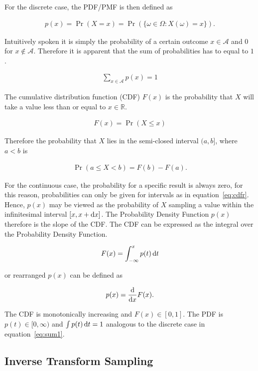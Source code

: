 For the discrete case, the PDF/PMF is then defined as

\begin{align}
p(x) = \Pr(X = x) = \Pr( \{\omega \in \Omega : X(\omega) = x \} ).
\end{align}

Intuitively spoken it is simply the probability of a certain outcome $x \in \mathcal{A}$ and $0$ for $x \notin \mathcal{A}$. Therefore it is apparent that the sum of probabilities has to equal to $1$.

\begin{align}
\label{eq:sum1}
\sum_{x\in\mathcal{A}}p(x) = 1
\end{align}

The cumulative distribution function (CDF) $F(x)$ is the probability that $X$ will take a value less than or equal to $x \in \mathbb{R}$.

\begin{align}
 F(x) = \Pr(X \leq x)
\end{align}

Therefore the probability that $X$ lies in the semi-closed interval $(a, b]$, where $a < b$ is  

\begin{align}
\label{eq:cdfr}
 \Pr(a \leq X < b) = F(b) - F(a).
\end{align}

For the continuous case, the probability for a specific result is always zero, for this reason, probabilities can only be given for intervals as in equation~\ref{eq:cdfr}. Hence, $p(x)$ may be viewed as the probability of $X$ sampling a value within the infinitesimal interval $[x, x + \mathop{}\!\mathrm{d} x]$. The Probability Density Function $p(x)$ therefore is the slope of the CDF. The CDF can be expressed as the integral over the Probability Density Function.

\begin{align}
\label{eq:cdfc}
 F(x) = \int_{-\infty}^{x}p(t)\mathop{}\!\mathrm{d} t
\end{align}

or rearranged $p(x)$ can be defined as

\begin{align}
 p(x) = \frac{\mathop{}\!\mathrm{d}}{\mathop{}\!\mathrm{d} x} F(x).
\end{align}

The CDF is monotonically increasing and $F(x) \in [0,1]$. The PDF is $p(t) \in [0, \infty)$ and $\int p(t)\mathop{}\!\mathrm{d} t = 1$ analogous to the discrete case in equation~\ref{eq:sum1}. 

\subsection{Inverse Transform Sampling}

